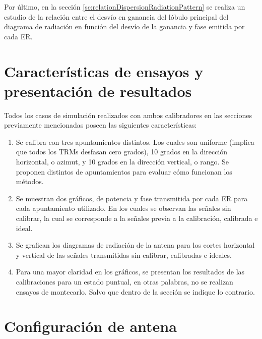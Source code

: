 Por último, en la sección \ref{sc:relationDispersionRadiationPattern} se realiza un estudio de la relación entre el desvío en
ganancia del lóbulo principal del diagrama de radiación en función del desvío de la ganancia y fase emitida por cada ER.


\section{Características de ensayos y presentación de resultados}
\label{sc:characteristics}

Todos los casos de simulación realizados con ambos calibradores en las secciones previamente mencionadas poseen las siguientes
características:
\begin{enumerate}
	\item Se calibra con tres apuntamientos distintos. Los cuales son uniforme (implica que todos los TRMs desfasan cero grados),
		10 grados en la dirección horizontal, o azimut, y 10 grados en la dirección vertical, o rango. Se proponen distintos de
		apuntamientos para evaluar cómo funcionan los métodos. 
	\item Se muestran dos gráficos, de potencia y fase transmitida por cada ER para cada apuntamiento utilizado. En los cuales se
		observan las señales sin calibrar, la cual se corresponde a la señales previa a la calibración, calibrada e ideal. 
	\item Se grafican los diagramas de radiación de la antena para los cortes horizontal y vertical de las señales transmitidas
		sin calibrar, calibradas e ideales.
	\item Para una mayor claridad en los gráficos, se presentan los resultados de las calibraciones para un estado puntual, en
		otras palabras, no se realizan ensayos de montecarlo. Salvo que dentro de la sección se indique lo contrario.
\end{enumerate}


\section{Configuración de antena}

